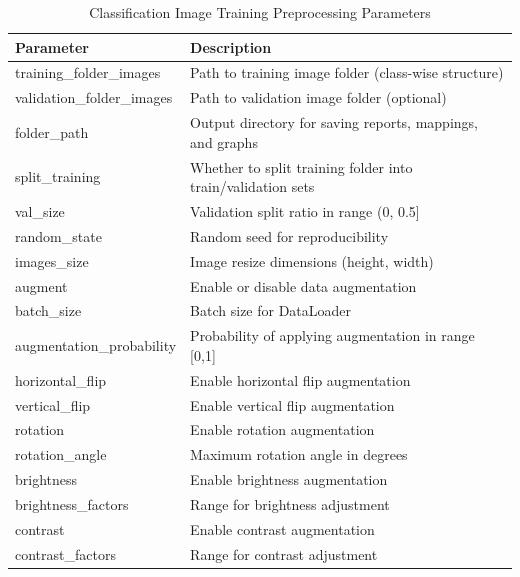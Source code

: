\begin{table}[h!]
\centering
\small
\renewcommand{\arraystretch}{1.15}
\setlength{\tabcolsep}{4pt}
\begin{tabular}{ll}
\toprule
\textbf{Parameter} & \textbf{Description} \\
\midrule

training\_folder\_images & Path to training image folder (class-wise structure) \\
validation\_folder\_images & Path to validation image folder (optional) \\
folder\_path & Output directory for saving reports, mappings, and graphs \\
split\_training & Whether to split training folder into train/validation sets \\
val\_size & Validation split ratio in range (0, 0.5] \\
random\_state & Random seed for reproducibility \\
images\_size & Image resize dimensions (height, width) \\
augment & Enable or disable data augmentation \\
batch\_size & Batch size for DataLoader \\
augmentation\_probability & Probability of applying augmentation in range [0,1] \\
horizontal\_flip & Enable horizontal flip augmentation \\
vertical\_flip & Enable vertical flip augmentation \\
rotation & Enable rotation augmentation \\
rotation\_angle & Maximum rotation angle in degrees \\
brightness & Enable brightness augmentation \\
brightness\_factors & Range for brightness adjustment \\
contrast & Enable contrast augmentation \\
contrast\_factors & Range for contrast adjustment \\

\bottomrule
\end{tabular}
\caption{Classification Image Training Preprocessing Parameters}
\end{table}
